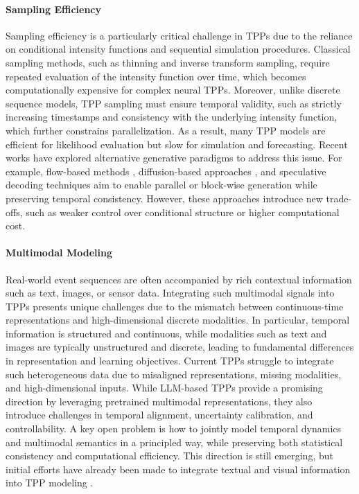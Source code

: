 \documentclass[10pt]{article} %
\begin{document}
\paragraph{Sampling Efficiency}
Sampling efficiency is a particularly critical challenge in TPPs due to the reliance on conditional intensity functions and sequential simulation procedures. Classical sampling methods, such as thinning and inverse transform sampling, require repeated evaluation of the intensity function over time, which becomes computationally expensive for complex neural TPPs. 
Moreover, unlike discrete sequence models, TPP sampling must ensure temporal validity, such as strictly increasing timestamps and consistency with the underlying intensity function, which further constrains parallelization. As a result, many TPP models are efficient for likelihood evaluation but slow for simulation and forecasting. 
Recent works have explored alternative generative paradigms to address this issue. For example, flow-based methods \citep{ludke2025edit,kerrigan2024eventflow,shou2025unified}, diffusion-based approaches \citep{yuan2023spatio,ludke2024unlocking,zhang2024neural}, and speculative decoding techniques \citep{gongtpp,bilovs2025speculative} aim to enable parallel or block-wise generation while preserving temporal consistency. However, these approaches introduce new trade-offs, such as weaker control over conditional structure or higher computational cost.

\paragraph{Multimodal Modeling}
Real-world event sequences are often accompanied by rich contextual information such as text, images, or sensor data. Integrating such multimodal signals into TPPs presents unique challenges due to the mismatch between continuous-time representations and high-dimensional discrete modalities. In particular, temporal information is structured and continuous, while modalities such as text and images are typically unstructured and discrete, leading to fundamental differences in representation and learning objectives. 
Current TPPs struggle to integrate such heterogeneous data due to misaligned representations, missing modalities, and high-dimensional inputs. While LLM-based TPPs provide a promising direction by leveraging pretrained multimodal representations, they also introduce challenges in temporal alignment, uncertainty calibration, and controllability. 
A key open problem is how to jointly model temporal dynamics and multimodal semantics in a principled way, while preserving both statistical consistency and computational efficiency. This direction is still emerging, but initial efforts have already been made to integrate textual and visual information into TPP modeling \citep{jiang2025danmakutppbench,liu2024tpp,zhang2023integration,kong2025language}.
\end{document}
